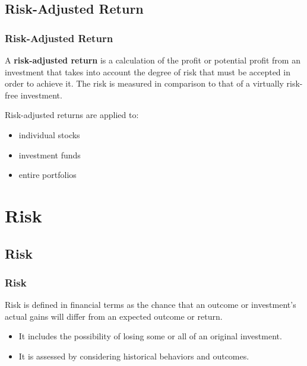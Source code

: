 \documentclass{beamer}
\begin{document}
\subsection{Risk-Adjusted Return}

\begin{frame}
\frametitle{\textbf{Risk-Adjusted Return}}

\begin{definition}
\justifying
A \textbf{risk-adjusted return} is a calculation of the profit or potential profit from an investment that takes into account the degree of risk that must be accepted in order to achieve it. The risk is measured in comparison to that of a virtually risk-free investment.
\end{definition}

\vspace{0.8cm}
\justifying
Risk-adjusted returns are applied to:
\begin{itemize}
	\item individual stocks
	\item investment funds
	\item entire portfolios
\end{itemize}

\end{frame}










\section{Risk}









\subsection{Risk}

\begin{frame}
\frametitle{\textbf{Risk}}

\begin{definition}
\justifying
Risk is defined in financial terms as the chance that an outcome or investment's actual gains will differ from an expected outcome or return.
\end{definition}

\vspace{0.6cm}
\justifying
\begin{itemize}
	\justifying
	\item It includes the possibility of losing some or all of an original investment.
	\item It is assessed by considering historical behaviors and outcomes.
\end{itemize}

\end{frame}
\end{document}
